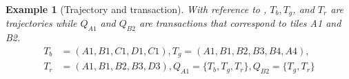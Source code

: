 \documentclass[
]{ceurart}
\newtheorem{example}{Example}
\begin{document}
\begin{example}[Trajectory and transaction]
With reference to , 
$T_b,T_g$, and $T_r$ are trajectories while $Q_{A1}$ and $Q_{B2}$ are transactions that correspond to tiles A1 and B2.
{\small
\begin{align*}
    T_b&= (A1, B1, C1, D1, C1),
    T_g = (A1, B1, B2, B3, B4, A4),\\
    T_r&= (A1, B1, B2, B3, D3),Q_{A1}=\{T_b, T_g, T_r \},Q_{B2}= \{T_g, T_r \}
\end{align*}
}
\end{example}
%
 
\end{document}
